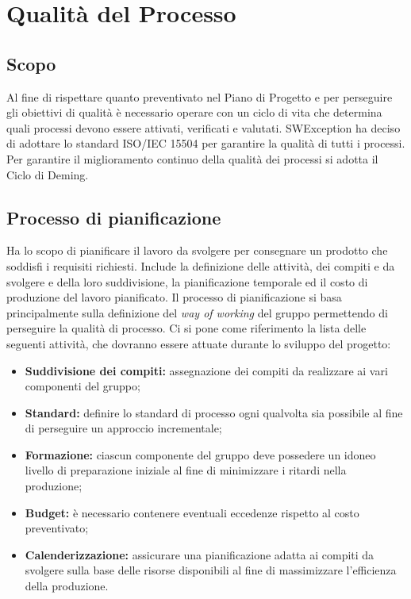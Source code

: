 \section{Qualità del Processo}
\subsection{Scopo}
Al fine di rispettare quanto preventivato nel Piano di Progetto e per perseguire gli obiettivi di qualità è necessario operare con un ciclo di vita che determina quali processi
devono essere attivati, verificati e valutati. SWException ha deciso di adottare lo standard ISO/IEC 15504 per garantire la qualità di tutti i processi.
Per garantire il miglioramento continuo della qualità dei processi si adotta il Ciclo di Deming. 

\subsection{Processo di pianificazione}
Ha lo scopo di pianificare il lavoro da svolgere per consegnare un prodotto che soddisfi i requisiti richiesti. Include la definizione delle attività, dei compiti e da svolgere 
e della loro suddivisione, la pianificazione temporale ed il costo di produzione del lavoro pianificato.
Il processo di pianificazione si basa principalmente sulla definizione del \textit{way of working} del gruppo permettendo di perseguire la qualità di processo.
Ci si pone come riferimento la lista delle seguenti attività, che dovranno essere attuate durante lo sviluppo del progetto:

\begin{itemize}
    \item \textbf{Suddivisione dei compiti:} assegnazione dei compiti da realizzare ai vari componenti del gruppo;
    \item \textbf{Standard:} definire lo standard di processo ogni qualvolta sia possibile al fine di perseguire un approccio incrementale;
    \item \textbf{Formazione:} ciascun componente del gruppo deve possedere un idoneo  livello di preparazione iniziale al fine di minimizzare i ritardi nella produzione;
    \item \textbf{Budget:} è necessario contenere eventuali eccedenze rispetto al costo preventivato;
    \item \textbf{Calenderizzazione:} assicurare una pianificazione adatta ai compiti da svolgere sulla base delle risorse disponibili al fine di massimizzare l'efficienza della produzione.
\end{itemize}


